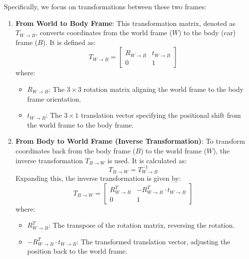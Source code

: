 Specifically, we focus on transformations between these two frames:
\begin{enumerate}
    \item \textbf{From World to Body Frame}: This transformation matrix, denoted as \( T_{W \to B} \), converts coordinates from the world frame (\( W \)) to the body (car) frame (\( B \)). It is defined as:
    \begin{equation}
        T_{W \to B} = \begin{bmatrix} 
        R_{W \to B} & t_{W \to B} \\ 
        0 & 1 
        \end{bmatrix}
    \end{equation}
    where:
    \begin{itemize}
        \item \( R_{W \to B} \): The \( 3 \times 3 \) rotation matrix aligning the world frame to the body frame orientation.
        \item \( t_{W \to B} \): The \( 3 \times 1 \) translation vector specifying the positional shift from the world frame to the body frame.
    \end{itemize}
    
    \item \textbf{From Body to World Frame (Inverse Transformation)}: To transform coordinates back from the body frame (\( B \)) to the world frame (\( W \)), the inverse transformation \( T_{B \to W} \) is used. It is calculated as:
    \begin{equation}
        T_{B \to W} = T_{W \to B}^{-1}
    \end{equation}
    Expanding this, the inverse transformation is given by:
    \begin{equation}
        T_{B \to W} = \begin{bmatrix} 
        R_{W \to B}^T & -R_{W \to B}^T \cdot t_{W \to B} \\ 
        0 & 1 
        \end{bmatrix}
    \end{equation}
    where:
    \begin{itemize}
        \item \( R_{W \to B}^T \): The transpose of the rotation matrix, reversing the rotation.
        \item \( -R_{W \to B}^T \cdot t_{W \to B} \): The transformed translation vector, adjusting the position back to the world frame.
    \end{itemize}
\end{enumerate}
